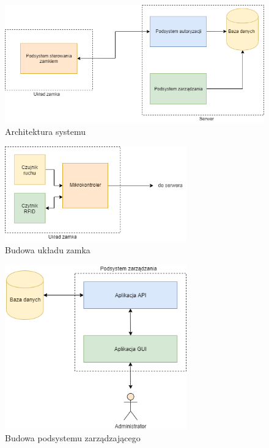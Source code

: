             \begin{figure}[h!]
                \includegraphics[width=\linewidth]{chapters/images/hl-arch3.png}
                \caption{Architektura systemu}
                \label{fig:hl-arch}
            \end{figure}

            \vspace{10mm} 

            \begin{figure}[h!]
                \centering
                \includegraphics[width=0.7\textwidth]{chapters/images/lock.png}
                \caption{Budowa układu zamka}
                \label{fig:lock-arch}
            \end{figure}

            \begin{figure}[h!]
                \centering
                \includegraphics[width=0.7\textwidth]{chapters/images/mngmt_subsystem.png}
                \caption{Budowa podsystemu zarządzającego}
                \label{fig:mngmt_subsystem}
            \end{figure}

